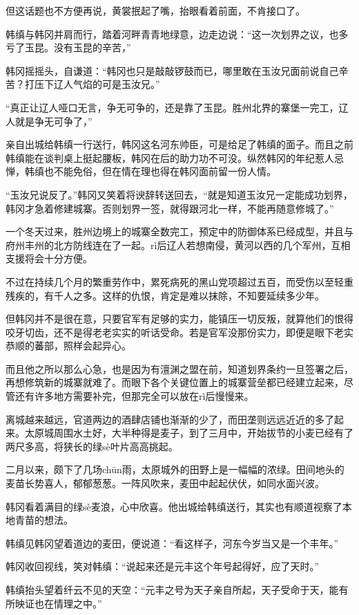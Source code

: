但这话题也不方便再说，黄裳抿起了嘴，抬眼看着前面，不肯接口了。

韩缜与韩冈并肩而行，踏着河畔青青地绿意，边走边说：“这一次划界之议，也多亏了玉昆。没有玉昆的辛苦，”

韩冈摇摇头，自谦道：“韩冈也只是敲敲锣鼓而已，哪里敢在玉汝兄面前说自己辛苦？打压下辽人气焰的可是玉汝兄。”

“真正让辽人哑口无言，争无可争的，还是靠了玉昆。胜州北界的寨堡一完工，辽人就是争无可争了，”

亲自出城给韩缜一行送行，韩冈这名河东帅臣，可是给足了韩缜的面子。而且之前韩缜能在谈判桌上挺起腰板，韩冈在后的助力功不可没。纵然韩冈的年纪惹人忌惮，韩缜也不能免俗，但在情在理也得在韩冈面前留一份人情。

“玉汝兄说反了。”韩冈又笑着将谀辞转送回去，“就是知道玉汝兄一定能成功划界，韩冈才急着修建城寨。否则划界一签，就得跟河北一样，不能再随意修城了。”

一个冬天过来，胜州边境上的城寨全数完工，预定中的防御体系已经成型，并且与府州丰州的北方防线连在了一起。rì后辽人若想南侵，黄河以西的几个军州，互相支援将会十分方便。

不过在持续几个月的繁重劳作中，累死病死的黑山党项超过五百，而受伤以至轻重残疾的，有千人之多。这样的仇恨，肯定是难以抹除，不知要延续多少年。

但韩冈并不是很在意，只要官军有足够的实力，能镇压一切反叛，就算他们的恨得咬牙切齿，还不是得老老实实的听话受命。若是官军没那份实力，即便是眼下老实恭顺的蕃部，照样会起异心。

而且他之所以那么心急，也是因为有澶渊之盟在前，知道划界条约一旦签署之后，再想修筑新的城寨就难了。而眼下各个关键位置上的城寨营垒都已经建立起来，尽管还有许多地方需要补完，但那完全可以放在rì后慢慢来。

离城越来越远，官道两边的酒肆店铺也渐渐的少了，而田垄则远远近近的多了起来。太原城周围水土好，大半种得是麦子，到了三月中，开始拔节的小麦已经有了两尺多高，将狭长的绿sè叶片高高挑起。

二月以来，颇下了几场chūn雨，太原城外的田野上是一幅幅的浓绿。田间地头的麦苗长势喜人，郁郁葱葱。一阵风吹来，麦田中起起伏伏，如同水面兴波。

韩冈看着满目的绿sè麦浪，心中欣喜。他出城给韩缜送行，其实也有顺道视察了本地青苗的想法。

韩缜见韩冈望着道边的麦田，便说道：“看这样子，河东今岁当又是一个丰年。”

韩冈收回视线，笑对韩缜：“说起来还是元丰这个年号起得好，应了天时。”

韩缜抬头望着纤云不见的天空：“元丰之号为天子亲自所起，天子受命于天，能有所映证也在情理之中。”

